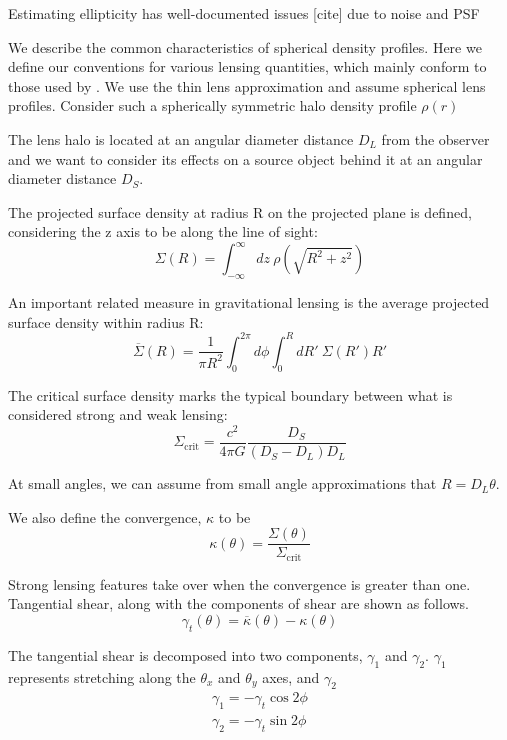 \documentclass[10pt]{article}
\begin{document}
Estimating ellipticity has well-documented issues [cite] due to noise and PSF


We describe the common characteristics of spherical density profiles.
Here we define our conventions for various lensing quantities, which mainly conform to those used by \citet{Dodelson2017}. We use the thin lens approximation and assume spherical lens profiles.
Consider such a spherically symmetric halo density profile $\rho(r)$

The lens halo is located at an angular diameter distance $D_L$ from the observer and we want to consider its effects on a source object behind it at an angular diameter distance $D_S$.

The projected surface density at radius R on the projected plane is defined, considering the z axis to be along the line of sight:
\begin{equation}
\Sigma(R) = \int_{-\infty}^{\infty}{dz\ \rho(\sqrt{R^2 + z^2})}
\end{equation}

An important related measure in gravitational lensing is the average projected surface density within radius R:
\begin{equation}
\overline{\Sigma}(R) = \frac{1}{\pi R^2} \int_0^{2\pi}{d\phi \int_0^{R}{dR'~\Sigma(R')R'}}
\end{equation}

The critical surface density marks the typical boundary between what is considered strong and weak lensing:
\begin{equation}
\Sigma_\mathrm{crit} = \frac{c^2}{4\pi G} \frac{D_S}{(D_S - D_L) D_L}
\end{equation}

At small angles, we can assume from small angle approximations that $R = D_L \theta$.

We also define the convergence, $\kappa$ to be
\begin{equation}
\kappa(\theta) = \frac{\Sigma(\theta)}{\Sigma_\mathrm{crit}}
\end{equation}

Strong lensing features take over when the convergence is greater than one.
Tangential shear, along with the components of shear are shown as follows.
\begin{equation}
\gamma_t(\theta) = \overline{\kappa}(\theta) - \kappa(\theta)
\end{equation}

The tangential shear is decomposed into two components, $\gamma_1$ and $\gamma_2$. $\gamma_1$ represents stretching along the $\theta_x$ and $\theta_y$ axes, and $\gamma_2$
\begin{equation}
\begin{split}
\gamma_1 = -\gamma_t \cos{2\phi}\\
\gamma_2 = -\gamma_t \sin{2\phi}
\end{split}
\end{equation}
\end{document}
